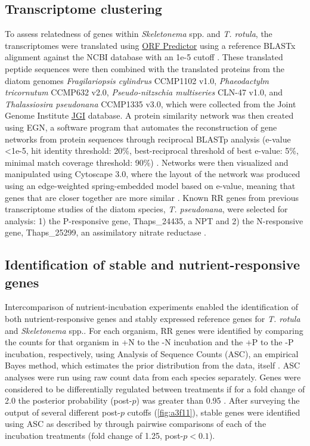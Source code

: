 \subsection{Transcriptome clustering}
To assess relatedness of genes within \textit{Skeletonema} spp. and \textit{T. rotula}, the transcriptomes were translated using \href{http://proteomics.ysu.edu/tools/OrfPredictor.html}{ORF Predictor} using a reference BLASTx alignment against the NCBI database with an 1e-5 cutoff \citep{Min2005}. These translated peptide sequences were then combined with the translated proteins from the diatom genomes \textit{Fragilariopsis cylindrus} CCMP1102 v1.0, \textit{Phaeodactylm tricornutum} CCMP632 v2.0, \textit{Pseudo-nitzschia multiseries} CLN-47 v1.0, and \textit{Thalassiosira pseudonana} CCMP1335 v3.0, which were collected from the Joint Genome Institute \href{http://genome.jgi-psf.org}{JGI} database. A protein similarity network was then created using EGN, a software program that automates the reconstruction of gene networks from protein sequences through reciprocal BLASTp analysis (e-value <1e-5, hit identity threshold: 20\%, best-reciprocal threshold of best e-value: 5\%, minimal match coverage threshold: 90\%) \citep{Halary2013, Halary2010}. Networks were then visualized and manipulated using Cytoscape 3.0, where the layout of the network was produced using an edge-weighted spring-embedded model based on e-value, meaning that genes that are closer together are more similar \citep{Smoot2011, Saito2012}. Known RR genes from previous transcriptome studies of the diatom species, \textit{T. pseudonana}, were selected for analysis: 1) the P-responsive gene, Thaps\_24435, a NPT \citep{Dyhrman2012} and 2) the N-responsive gene, Thaps\_25299, an assimilatory nitrate reductase \citep{Bender2014}. 
\subsection{Identification of stable and nutrient-responsive genes}
Intercomparison of nutrient-incubation experiments enabled the identification of both nutrient-responsive genes and stably expressed reference genes for \textit{T. rotula} and \textit{Skeletonema} spp.. For each organism, RR genes were identified by comparing the counts for that organism in +N to the -N incubation and the +P to the -P incubation, respectively, using Analysis of Sequence Counts (ASC), an empirical Bayes method, which estimates the prior distribution from the data, itself \citep{Wu2010}. ASC analyses were run using raw count data from each species separately. Genes were considered to be differentially regulated between treatments if for a fold change of 2.0 the posterior probability (post-$p$) was greater than 0.95 \citep{Dyhrman2012}. After surveying the output of several different post-$p$ cutoffs (\cref{fig:a3f11}), stable genes were identified using ASC as described by \citet{Alexander2012} through pairwise comparisons of each of the incubation treatments (fold change of 1.25, post-$p < 0.1$). 

